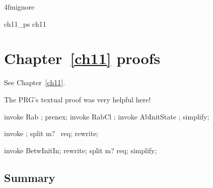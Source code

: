 \ai4fmignore{
\begin{zsection}
  \SECTION ch11\_ps \parents ch11
\end{zsection}
}
\chapter{Chapter~\ref{ch11} proofs}

See Chapter~\ref{ch11}.

The PRG's textual proof was very helpful here!
%
\begin{LPScript}\begin{zproof}[tBetwAbsInitSimAppl]
   invoke Rab ;
   prenex;
   invoke RabCl ;
   invoke AbInitState ;
   simplify;
\end{zproof}\end{LPScript}

\begin{LPScript}\begin{zproof}[tBetwAbsInputSimAppl]
   invoke ;
   split m? \in \ran~req;
   rewrite;
\end{zproof}\end{LPScript}

\begin{LPScript}\begin{zproof}[tBetwAbsInitInputs]
    invoke BetwInitIn;
    rewrite;
    split m? \in \ran req;
    simplify;
\end{zproof}\end{LPScript}

\newpage
\section{Summary}\label{ch11.ps.summary}
\lpscriptsummary
